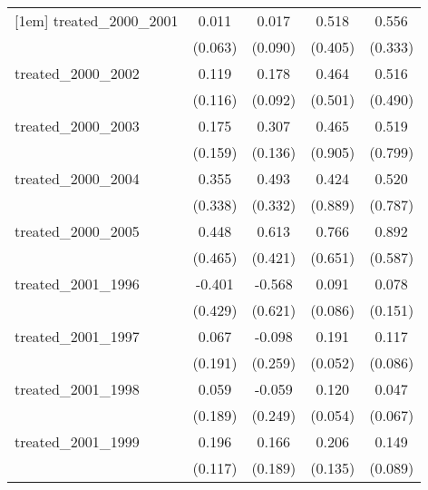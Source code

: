 {\begin{tabular}{l*{4}{c}}
[1em]
treated\_2000\_2001&       0.011         &       0.017         &       0.518         &       0.556         \\
            &     (0.063)         &     (0.090)         &     (0.405)         &     (0.333)         \\
[1em]
treated\_2000\_2002&       0.119         &       0.178         &       0.464         &       0.516         \\
            &     (0.116)         &     (0.092)         &     (0.501)         &     (0.490)         \\
[1em]
treated\_2000\_2003&       0.175         &       0.307\sym{*}  &       0.465         &       0.519         \\
            &     (0.159)         &     (0.136)         &     (0.905)         &     (0.799)         \\
[1em]
treated\_2000\_2004&       0.355         &       0.493         &       0.424         &       0.520         \\
            &     (0.338)         &     (0.332)         &     (0.889)         &     (0.787)         \\
[1em]
treated\_2000\_2005&       0.448         &       0.613         &       0.766         &       0.892         \\
            &     (0.465)         &     (0.421)         &     (0.651)         &     (0.587)         \\
[1em]
treated\_2001\_1996&      -0.401         &      -0.568         &       0.091         &       0.078         \\
            &     (0.429)         &     (0.621)         &     (0.086)         &     (0.151)         \\
[1em]
treated\_2001\_1997&       0.067         &      -0.098         &       0.191\sym{***}&       0.117         \\
            &     (0.191)         &     (0.259)         &     (0.052)         &     (0.086)         \\
[1em]
treated\_2001\_1998&       0.059         &      -0.059         &       0.120\sym{*}  &       0.047         \\
            &     (0.189)         &     (0.249)         &     (0.054)         &     (0.067)         \\
[1em]
treated\_2001\_1999&       0.196         &       0.166         &       0.206         &       0.149         \\
            &     (0.117)         &     (0.189)         &     (0.135)         &     (0.089)         \\

\end{tabular}}
